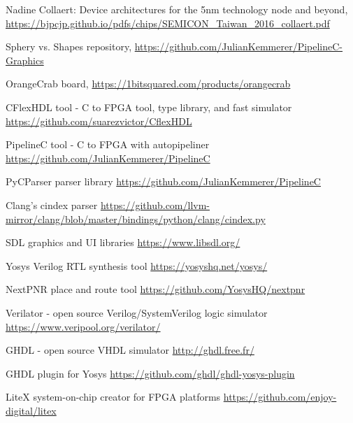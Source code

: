 \documentclass[conference]{IEEEtran}
\begin{document}
\begin{thebibliography}{00}

 Nadine Collaert: Device architectures for the 5nm technology node and beyond, 
\url{https://bjpcjp.github.io/pdfs/chips/SEMICON_Taiwan_2016_collaert.pdf}

 Sphery vs. Shapes repository, \url{https://github.com/JulianKemmerer/PipelineC-Graphics}

 OrangeCrab board, \url{https://1bitsquared.com/products/orangecrab}

 CFlexHDL tool - C to FPGA tool, type library, and fast simulator \url{https://github.com/suarezvictor/CflexHDL}

 PipelineC tool - C to FPGA with autopipeliner \url{https://github.com/JulianKemmerer/PipelineC}

 PyCParser parser library
\url{https://github.com/JulianKemmerer/PipelineC}

 Clang's cindex parser
\url{https://github.com/llvm-mirror/clang/blob/master/bindings/python/clang/cindex.py}

 SDL graphics and UI libraries
\url{https://www.libsdl.org/}

 Yosys Verilog RTL synthesis tool
\url{https://yosyshq.net/yosys/}

 NextPNR place and route tool
\url{https://github.com/YosysHQ/nextpnr}

 Verilator - open source Verilog/SystemVerilog logic simulator
\url{https://www.veripool.org/verilator/}

 GHDL - open source VHDL simulator
\url{http://ghdl.free.fr/}

 GHDL plugin for Yosys
\url{https://github.com/ghdl/ghdl-yosys-plugin}

 LiteX system-on-chip creator for FPGA platforms
\url{https://github.com/enjoy-digital/litex}

\end{thebibliography}
\end{document}
